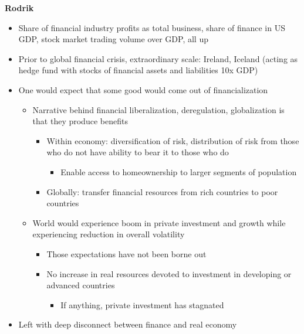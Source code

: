 \textbf{Rodrik}

\begin{itemize}
\tightlist
\item
  Share of financial industry profits as total business, share of
  finance in US GDP, stock market trading volume over GDP, all up
\item
  Prior to global financial crisis, extraordinary scale: Ireland,
  Iceland (acting as hedge fund with stocks of financial assets and
  liabilities 10x GDP)
\item
  One would expect that some good would come out of financialization

  \begin{itemize}
  \tightlist
  \item
    Narrative behind financial liberalization, deregulation,
    globalization is that they produce benefits

    \begin{itemize}
    \tightlist
    \item
      Within economy: diversification of risk, distribution of risk from
      those who do not have ability to bear it to those who do

      \begin{itemize}
      \tightlist
      \item
        Enable access to homeownership to larger segments of population
      \end{itemize}
    \item
      Globally: transfer financial resources from rich countries to poor
      countries
    \end{itemize}
  \item
    World would experience boom in private investment and growth while
    experiencing reduction in overall volatility

    \begin{itemize}
    \tightlist
    \item
      Those expectations have not been borne out
    \item
      No increase in real resources devoted to investment in developing
      or advanced countries

      \begin{itemize}
      \tightlist
      \item
        If anything, private investment has stagnated
      \end{itemize}
    \end{itemize}
  \end{itemize}
\item
  Left with deep disconnect between finance and real economy


\end{itemize}
